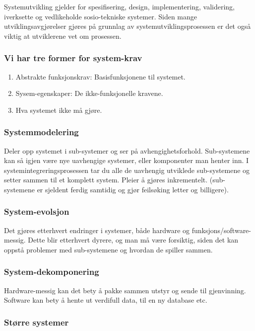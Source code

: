 \documentclass[11pt]{article}
\begin{document}
   Systemutvikling gjelder for spesifisering, design, implementering, validering, iverksette og 
   vedlikeholde sosio-tekniske systemer. Siden mange utviklingsavgjørelser gjøres på grunnlag av 
   systemutviklingsprosessen er det også viktig at utviklerene vet om prosessen.
\subsubsection{Vi har tre former for system-krav}
\label{sec-2.4.1}

\begin{enumerate}
\item Abstrakte funksjonskrav: Basisfunksjonene til systemet.
\item Sysem-egenskaper: De ikke-funksjonelle kravene.
\item Hva systemet ikke må gjøre.
\end{enumerate}
\subsubsection{Systemmodelering}
\label{sec-2.4.2}

    Deler opp systemet i sub-systemer og ser på avhengighetsforhold. 
    Sub-systemene kan så igjen være nye uavhengige systemer, eller komponenter man henter inn.
    I systemintegreringsprosessen tar du alle de uavhengig utviklede sub-systemene og setter
    sammen til et komplett system. Pleier å gjøres inkrementelt. (sub-systemene er sjeldent 
    ferdig samtidig og gjør feilsøking letter og billigere).
\subsubsection{System-evolsjon}
\label{sec-2.4.3}

    Det gjøres etterhvert endringer i systemer, både hardware og funksjons/software-messig. 
    Dette blir etterhvert dyrere, og man må være forsiktig, siden det kan oppstå problemer med sub-systemene og hvordan de spiller sammen.
\subsubsection{System-dekomponering}
\label{sec-2.4.4}

    Hardware-messig kan det bety å pakke sammen utstyr og sende til gjenvinning.
    Software kan bety å hente ut verdifull data, til en ny database etc.
\subsubsection{Større systemer}
\label{sec-2.4.5}
\end{document}
